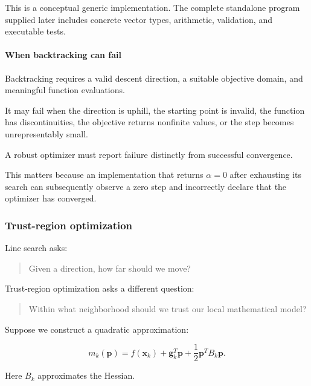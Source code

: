 This is a conceptual generic implementation. The complete standalone program supplied later includes concrete vector types, arithmetic, validation, and executable tests.

\paragraph{When backtracking can fail}\label{02-foundations-ii-ch026-when-backtracking-can-fail}

\hypertarget{02-foundations-ii-ch026-when-backtracking-can-fail}{}

Backtracking requires a valid descent direction, a suitable objective domain, and meaningful function evaluations.

It may fail when the direction is uphill, the starting point is invalid, the function has discontinuities, the objective returns nonfinite values, or the step becomes unrepresentably small.

A robust optimizer must report failure distinctly from successful convergence.

This matters because an implementation that returns \(\alpha=0\) after exhausting its search can subsequently observe a zero step and incorrectly declare that the optimizer has converged.

\subsubsection{Trust-region optimization}\label{02-foundations-ii-ch026-trust-region-optimization}

\hypertarget{02-foundations-ii-ch026-trust-region-optimization}{}

Line search asks:

\begin{quote}
Given a direction, how far should we move?
\end{quote}

Trust-region optimization asks a different question:

\begin{quote}
Within what neighborhood should we trust our local mathematical model?
\end{quote}

Suppose we construct a quadratic approximation:

\[
m_k(\mathbf p) = f(\mathbf x_k)+ \mathbf g_k^T\mathbf p+ \frac12\mathbf p^TB_k\mathbf p.
\]

Here \(B_k\) approximates the Hessian.

